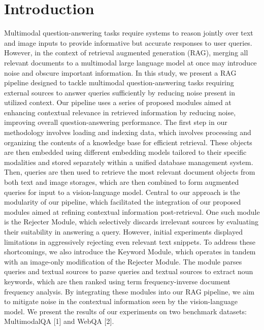 \documentclass[twocolumn]{article}
\begin{document}
\section{Introduction}
Multimodal question-answering tasks require systems to reason jointly over text and image inputs to provide informative but accurate responses to user queries. However, in the context of retrieval augmented generation (RAG), merging all relevant documents to a multimodal large language model at once may introduce noise and obscure important information.
In this study, we present a RAG pipeline designed to tackle multimodal question-answering tasks requiring external sources to answer queries sufficiently by reducing noise present in utilized context. Our pipeline uses a series of proposed modules aimed at enhancing contextual relevance in retrieved information by reducing noise, improving overall question-answering performance.
The first step in our methodology involves loading and indexing data, which involves processing and organizing the contents of a knowledge base for efficient retrieval. These objects are then embedded using different embedding models tailored to their specific modalities and stored separately within a unified database management system. Then, queries are then used to retrieve the most relevant document objects from both text and image storages, which are then combined to form augmented queries for input to a vision-language model.
Central to our approach is the modularity of our pipeline, which facilitated the integration of our proposed modules aimed at refining contextual information post-retrieval. One such module is the Rejecter Module, which selectively discards irrelevant sources by evaluating their suitability in answering a query. However, initial experiments displayed limitations in aggressively rejecting even relevant text snippets.
To address these shortcomings, we also introduce the Keyword Module, which operates in tandem with an image-only modification of the Rejecter Module. The module parses queries and textual sources to parse queries and textual sources to extract noun keywords, which are then ranked using term frequency-inverse document frequency analysis.
By integrating these modules into our RAG pipeline, we aim to mitigate noise in the contextual information seen by the vision-language model. We present the results of our experiments on two benchmark datasets: MultimodalQA [1] and WebQA [2].
\end{document}
